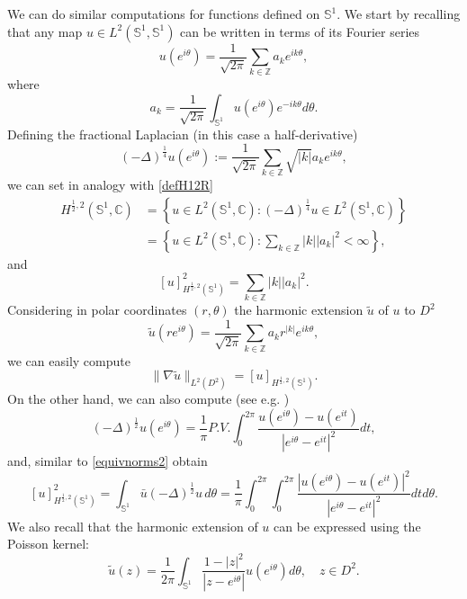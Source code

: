 \documentclass[12pt, a4paper]{article}
\newcommand{\sph}{\mathbb{S}}
\renewcommand{\(}{\left(}
\renewcommand{\)}{\right)}
\begin{document}
We can do similar computations for functions defined on $\sph^1$. We start by recalling that any map $u\in L^2(\sph^1,\sph^1)$ can be written in terms of its Fourier series
$$u(e^{i\theta})=\frac{1}{\sqrt{2\pi}}\sum_{k\in\mathbb{Z}}a_ke^{ik\theta},$$
where
\begin{equation}\label{deffoucoeff}
a_k=\frac{1}{\sqrt{2\pi}}\int_{\sph^1}u(e^{i\theta})e^{-ik\theta}d\theta.
\end{equation}
Defining the fractional Laplacian (in this case a half-derivative)
\begin{equation}\label{lapl14}
(-\Delta)^\frac14 u(e^{i\theta}):= \frac{1}{\sqrt{2\pi}}\sum_{k\in\mathbb{Z}}\sqrt{|k|}a_k e^{ik\theta},
\end{equation}
we can set in analogy with \eqref{defH12R}
\begin{equation}\label{defH12S1}
\begin{split}
H^{\frac{1}{2},2}(\sph^1,\mathbb{C})&=\left\{u\in L^2(\sph^1,\mathbb{C}): (-\Delta)^\frac14 u\in L^2(\sph^1,\mathbb{C})\right\}\\
&=\left\{u\in L^2(\sph^1,\mathbb{C}):\sum_{k\in\mathbb{Z}}|k||a_k|^2<\infty\right\},
\end{split}
\end{equation}
and
$$[u]_{H^{\frac{1}{2},2}(\sph^1)}^2=\sum_{k\in\mathbb{Z}}|k||a_k|^2.$$
Considering in polar coordinates $(r,\theta)$ the harmonic extension $\tilde u$ of $u$ to $D^2$
\begin{equation}\label{uPoisson}
\tilde u(re^{i\theta})=\frac{1}{\sqrt{2\pi}}\sum_{k\in\mathbb{Z}}a_kr^{|k|}e^{ik\theta},
\end{equation}
we can easily compute
\begin{equation}\label{equivnormsS1}
\|\nabla \tilde u\|_{L^2(D^2)}=[u]_{H^{\frac{1}{2},2}(\sph^1)}.
\end{equation}
On the other hand, we can also compute (see e.g. \cite[Proposition A.2]{DLMR}) 
\begin{equation}\label{FLS1}
(-\Delta)^\frac12 u(e^{i\theta})=\frac{1}{\pi}P.V. \int_{0}^{2\pi}\frac{u(e^{i\theta})-u(e^{it})}{|e^{i\theta}-e^{it}|^2}dt,
\end{equation}
and, similar to \eqref{equivnorms2} obtain
\begin{equation}\label{equivnorms3}
[u]_{H^{\frac{1}{2},2}(\sph^1)}^2=\int_{\sph^1}\bar u (-\Delta)^{\frac12}u\, d\theta= \frac{1}{\pi}\int_0^{2\pi}\int_0^{2\pi}  \frac{|u(e^{i\theta})-u(e^{it})|^2}{|e^{i\theta}-e^{it}|^2}dtd\theta.
\end{equation}
We also recall that the harmonic extension of $u$ can be expressed using the Poisson kernel:
\begin{equation}\label{uPoisson2}
\tilde u(z)=\frac{1}{2\pi}\int_{\sph^1}\frac{1-|z|^2}{|z- e^{i\theta}|}u(e^{i\theta})d\theta, \quad z\in D^2.
\end{equation}
\end{document}
